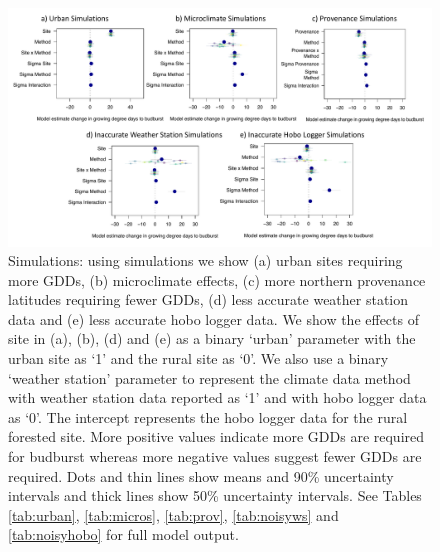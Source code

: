 \documentclass{article}\usepackage[]{graphicx}\usepackage[]{color}
\begin{document}
  
\begin{figure}[H]
      \centering
      \includegraphics[width=16cm]{..//analyses/figures/muplot_sims.pdf}
\caption{ Simulations: using simulations we show (a) urban sites requiring more GDDs, (b) microclimate effects, (c) more northern provenance latitudes requiring fewer GDDs, (d) less accurate weather station data and (e) less accurate hobo logger data. We show the effects of site in (a), (b), (d) and (e) as a binary `urban' parameter with the urban site as `1' and the rural site as `0'. We also use a binary `weather station' parameter to represent the climate data method with weather station data reported as `1' and with hobo logger data as `0'. The intercept represents the hobo logger data for the rural forested site. More positive values indicate more GDDs are required for budburst whereas more negative values suggest fewer GDDs are required. Dots and thin lines show means and 90\% uncertainty intervals and thick lines show 50\% uncertainty intervals. See Tables \ref{tab:urban}, \ref{tab:micros}, \ref{tab:prov}, \ref{tab:noisyws} and \ref{tab:noisyhobo} for full model output. }
\label{fig:musims}
\end{figure}
  
\end{document}
